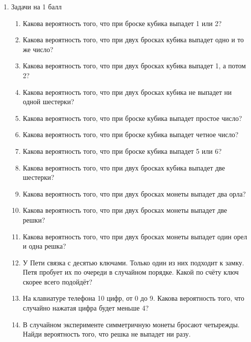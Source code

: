 \documentclass[12pt]{article} %
\begin{document}
\begin{enumerate}
  \setlength\itemsep{2em}

\item Задачи на 1 балл

\begin{enumerate}
  \setlength\itemsep{2em}

\item Какова вероятность того, что при броске кубика выпадет 1 или 2?    

\item Какова вероятность того, что при двух бросках кубика выпадет одно и то же число?

\item Какова вероятность того, что при двух бросках кубика выпадет 1, а потом 2?

\item Какова вероятность того, что при двух бросках кубика не выпадет ни одной шестерки?

\item Какова вероятность того, что при броске кубика выпадет простое число?

\item Какова вероятность того, что при броске кубика выпадет четное число?

\item Какова вероятность того, что при броске кубика выпадет 5 или 6?

\item Какова вероятность того, что при двух бросках кубика выпадет две шестерки?

\item Какова вероятность того, что при двух бросках монеты выпадет два орла?

\item Какова вероятность того, что при двух бросках монеты выпадет две решки?

\item Какова вероятность того, что при двух бросках монеты выпадет один орел и одна решка?

\item У Пети связка с десятью ключами. Только один из них подходит к замку. Петя пробует их по очереди в случайном порядке. Какой по счёту ключ скорее всего подойдёт?

\item	На клавиатуре телефона 10 цифр, от 0 до 9. Какова вероятность того, что случайно нажатая цифра будет меньше 4?

\item	В случайном эксперименте симметричную монеты бросают четырежды. Найди вероятность того, что решка не выпадет ни разу.


\end{enumerate}
\end{enumerate}
\end{document}
